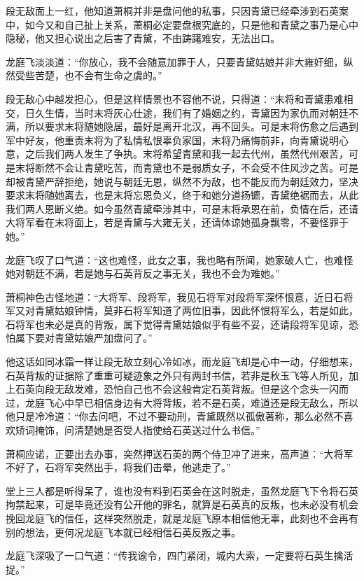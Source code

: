 段无敌面上一红，他知道萧桐并非是盘问他的私事，只因青黛已经牵涉到石英案中，如今又和自己扯上关系，萧桐必定要盘根究底的，只是他和青黛之事乃是心中隐秘，他又担心说出之后害了青黛，不由踌躇难安，无法出口。

龙庭飞淡淡道：“你放心，我不会随意加罪于人，只要青黛姑娘并非大雍奸细，纵然受些苦楚，也不会有生命之虞的。”

段无敌心中越发担心，但是这样情景也不容他不说，只得道：“末将和青黛患难相交，日久生情，当时末将灰心仕途，我们有了婚姻之约，青黛因为家仇而对朝廷不满，所以要求末将随她隐居，最好是离开北汉，再不回头。可是末将伤愈之后遇到军中好友，他重责末将为了私情私恨辜负家国，末将乃痛悔前非，向青黛说明心意，之后我们两人发生了争执。末将希望青黛和我一起去代州，虽然代州艰苦，可是末将断然不会让青黛吃苦，而青黛也不是弱质女子，不会受不住风沙之苦。可是却被青黛严辞拒绝，她说与朝廷无恩，纵然不为敌，也不能反而为朝廷效力，坚决要求末将随她离去，也是末将忘恩负义，终于和她分道扬镳，青黛绝裾而去，从此我们两人恩断义绝。如今虽然青黛牵涉其中，可是末将承恩在前，负情在后，还请大将军看在末将面上，若是青黛与大雍无关，还请体谅她孤身飘零，不要怪罪于她。”

龙庭飞叹了口气道：“这也难怪，此女之事，我也略有所闻，她家破人亡，也难怪她对朝廷不满，若是她与石英背反之事无关，我也不会为难她。”

萧桐神色古怪地道：“大将军、段将军，我见石将军对段将军深怀恨意，近日石将军又对青黛姑娘钟情，莫非石将军知道了两位旧事，因此怀恨将军么，若是如此，石将军也未必是真的背叛，属下觉得青黛姑娘似乎有些不妥，还请段将军见谅，恐怕属下要对青黛姑娘严加盘问了。”

他这话如同冰霜一样让段无敌立刻心冷如冰，而龙庭飞却是心中一动，仔细想来，石英背叛的证据除了重重可疑迹象之外只有两封书信，若非是秋玉飞等人所见，加上石英向段无敌发难，恐怕自己也不会这般肯定石英背叛。但是这个念头一闪而过，龙庭飞心中早已相信身边有大将背叛，若不是石英，难道还是段无敌么，所以他只是冷冷道：“你去问吧，不过不要动刑，青黛既然以孤傲著称，那么必然不喜欢矫词掩饰，问清楚她是否受人指使给石英送过什么书信。”

萧桐应诺，正要出去办事，突然押送石英的两个侍卫冲了进来，高声道：“大将军不好了，石将军突然出手，将我们击晕，他逃走了。”

堂上三人都是听得呆了，谁也没有料到石英会在这时脱走，虽然龙庭飞下令将石英拘禁起来，可是毕竟还没有公开他的罪名，就算是石英真的反叛，也未必没有机会挽回龙庭飞的信任，这样突然脱走，就是龙庭飞原本相信他无辜，此刻也不会再有别的想法，更何况龙庭飞本就已经相信石英反叛之事。

龙庭飞深吸了一口气道：“传我谕令，四门紧闭，城内大索，一定要将石英生擒活捉。”


